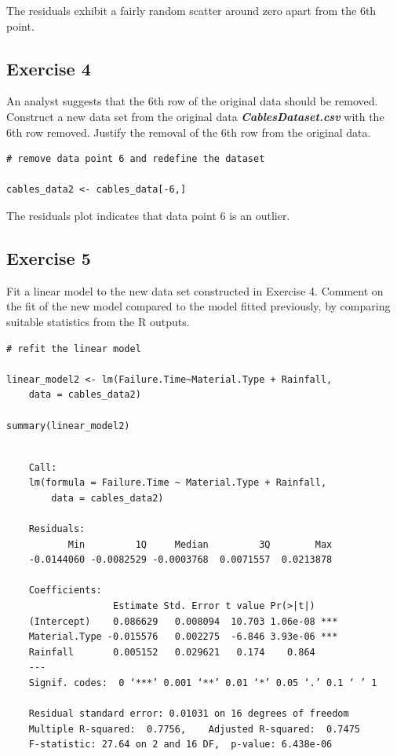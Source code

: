\documentclass[a4paper,12pt]{article}
\begin{document}
\noindent The residuals exhibit a fairly random scatter around zero
apart from the 6th point.


\newpage 
\subsection*{Exercise 4}

\noindent An analyst suggests that the 6th row of the original data should be removed. Construct a new data set from the original data \textbf{\textit{CablesDataset.csv}}
with the 6th row removed. Justify the removal of the 6th row from the original data.


\begin{framed} \begin{verbatim}
# remove data point 6 and redefine the dataset

cables_data2 <- cables_data[-6,]
\end{verbatim} \end{framed}


\noindent The residuals plot indicates that data point 6 is an outlier.
\newpage 
\subsection*{Exercise 5}

\noindent Fit a linear model to the new data set constructed in Exercise 4. Comment on the fit of the new model compared to the model fitted previously, by comparing suitable statistics from the R
outputs.

\begin{framed}\begin{verbatim}
# refit the linear model

linear_model2 <- lm(Failure.Time~Material.Type + Rainfall,
    data = cables_data2)

summary(linear_model2)
\end{verbatim} \end{framed}

\newpage 
\begin{verbatim}
 
    Call:
    lm(formula = Failure.Time ~ Material.Type + Rainfall, 
        data = cables_data2)
    
    Residuals:
           Min         1Q     Median         3Q        Max 
    -0.0144060 -0.0082529 -0.0003768  0.0071557  0.0213878 
    
    Coefficients:
                   Estimate Std. Error t value Pr(>|t|)    
    (Intercept)    0.086629   0.008094  10.703 1.06e-08 ***
    Material.Type -0.015576   0.002275  -6.846 3.93e-06 ***
    Rainfall       0.005152   0.029621   0.174    0.864    
    ---
    Signif. codes:  0 ‘***’ 0.001 ‘**’ 0.01 ‘*’ 0.05 ‘.’ 0.1 ‘ ’ 1
    
    Residual standard error: 0.01031 on 16 degrees of freedom
    Multiple R-squared:  0.7756,	Adjusted R-squared:  0.7475 
    F-statistic: 27.64 on 2 and 16 DF,  p-value: 6.438e-06
\end{verbatim}
\end{document}
